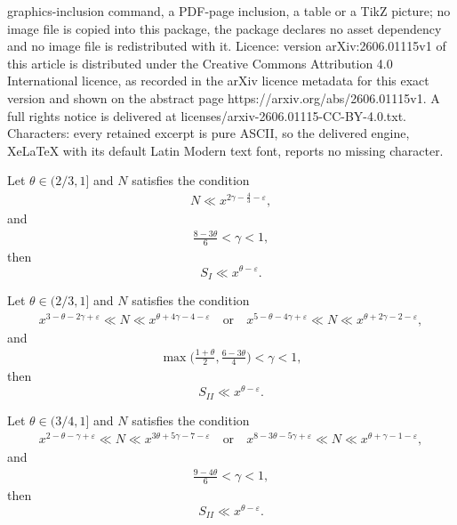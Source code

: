 \documentclass[10pt,a4paper]{amsart}
\begin{document}
graphics-inclusion command, a PDF-page inclusion, a table or a TikZ picture; no image file is copied into this package, the package declares no asset dependency and no image file is redistributed with it. Licence: version arXiv:2606.01115v1 of this article is distributed under the Creative Commons Attribution 4.0 International licence, as recorded in the arXiv licence metadata for this exact version and shown on the abstract page https://arxiv.org/abs/2606.01115v1. A full rights notice is delivered at licenses/arxiv-2606.01115-CC-BY-4.0.txt. Characters: every retained excerpt is pure ASCII, so the delivered engine, XeLaTeX with its default Latin Modern text font, reports no missing character.
\begin{proposition}[Type I]\label{lem:type1}
Let $\theta \in (2/3,1]$ and $N$ satisfies the condition
\begin{align*}
N \ll x^{2\gamma -\frac{4}{3}-\varepsilon} ,
\end{align*}
and
\begin{align}\label{condition of type1}
\frac{8-3\theta}{6} < \gamma <1,
\end{align}
then
$$
S_I \ll x^{\theta-\varepsilon}.
$$
\end{proposition}

\begin{proposition}[Type II]\label{lem:type2_2}
	Let $\theta \in (2/3,1]$ and $N$ satisfies the condition
	\begin{align*}
		x^{3-\theta-2\gamma+\varepsilon} \ll N \ll x^{\theta + 4\gamma -4-\varepsilon} \quad \text{or} \quad x^{5-\theta-4\gamma +\varepsilon}\ll N \ll x^{\theta+2\gamma-2-\varepsilon},
	\end{align*}
	and
	\begin{align}\label{condition of type2_2}
		\max\Big(\frac{1+\theta}{2} , \frac{6-3\theta}{4}\Big) < \gamma <1,
	\end{align}
	then
	$$
	S_{II} \ll x^{\theta-\varepsilon}.
	$$
\end{proposition}

\begin{proposition}[Type II]\label{lem:type2_1}
	Let $\theta \in (3/4,1]$ and $N$ satisfies the condition
	\begin{align*}
		x^{2-\theta-\gamma +\varepsilon}\ll N \ll x^{3\theta+5\gamma-7-\varepsilon} \quad \text{or} \quad x^{8-3\theta-5\gamma+\varepsilon} \ll N \ll x^{\theta + \gamma -1-\varepsilon} ,
	\end{align*}
	and
	\begin{align}\label{condition of type2_1}
		\frac{9-4\theta}{6} < \gamma <1,
	\end{align}
	then
	$$
	S_{II} \ll x^{\theta-\varepsilon}.
	$$
\end{proposition}
\end{document}
